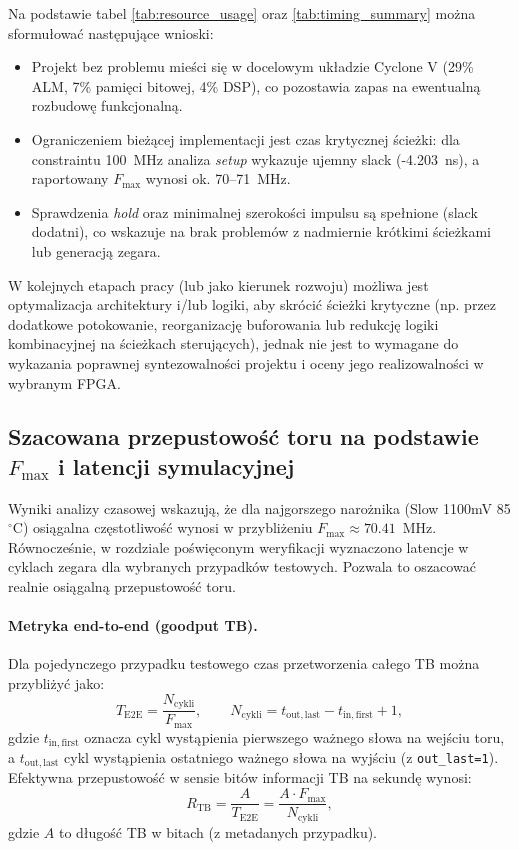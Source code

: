 Na podstawie tabel \ref{tab:resource_usage} oraz \ref{tab:timing_summary} można sformułować następujące wnioski:
\begin{itemize}
    \item Projekt bez problemu mieści się w docelowym układzie Cyclone V (29\% ALM, 7\% pamięci bitowej, 4\% DSP),
          co pozostawia zapas na ewentualną rozbudowę funkcjonalną.
    \item Ograniczeniem bieżącej implementacji jest czas krytycznej ścieżki: dla constraintu 100~MHz
          analiza \textit{setup} wykazuje ujemny slack (-4.203~ns), a raportowany $F_{\max}$ wynosi ok. 70--71~MHz.
    \item Sprawdzenia \textit{hold} oraz minimalnej szerokości impulsu są spełnione (slack dodatni),
          co wskazuje na brak problemów z nadmiernie krótkimi ścieżkami lub generacją zegara.
\end{itemize}

W kolejnych etapach pracy (lub jako kierunek rozwoju) możliwa jest optymalizacja architektury i/lub logiki,
aby skrócić ścieżki krytyczne (np. przez dodatkowe potokowanie, reorganizację buforowania lub redukcję logiki kombinacyjnej
na ścieżkach sterujących), jednak nie jest to wymagane do wykazania poprawnej syntezowalności projektu
i oceny jego realizowalności w wybranym FPGA.

\subsection{Szacowana przepustowość toru na podstawie $F_{\max}$ i latencji symulacyjnej}
\label{subsec:throughput_estimation}

Wyniki analizy czasowej wskazują, że dla najgorszego narożnika (Slow 1100mV 85$^\circ$C) osiągalna częstotliwość
wynosi w przybliżeniu $F_{\max}\approx 70.41$~MHz.
Równocześnie, w rozdziale poświęconym weryfikacji wyznaczono latencje w cyklach zegara dla wybranych przypadków testowych.
Pozwala to oszacować realnie osiągalną przepustowość toru.

\paragraph{Metryka end-to-end (goodput TB).}
Dla pojedynczego przypadku testowego czas przetworzenia całego TB można przybliżyć jako:
\[
T_{\mathrm{E2E}} = \frac{N_{\mathrm{cykli}}}{F_{\max}},
\qquad
N_{\mathrm{cykli}} = t_{\mathrm{out,last}} - t_{\mathrm{in,first}} + 1,
\]
gdzie $t_{\mathrm{in,first}}$ oznacza cykl wystąpienia pierwszego ważnego słowa na wejściu toru,
a $t_{\mathrm{out,last}}$ cykl wystąpienia ostatniego ważnego słowa na wyjściu (z \texttt{out\_last=1}).
Efektywna przepustowość w sensie bitów informacji TB na sekundę wynosi:
\[
R_{\mathrm{TB}} = \frac{A}{T_{\mathrm{E2E}}} = \frac{A\cdot F_{\max}}{N_{\mathrm{cykli}}},
\]
gdzie $A$ to długość TB w bitach (z metadanych przypadku).


